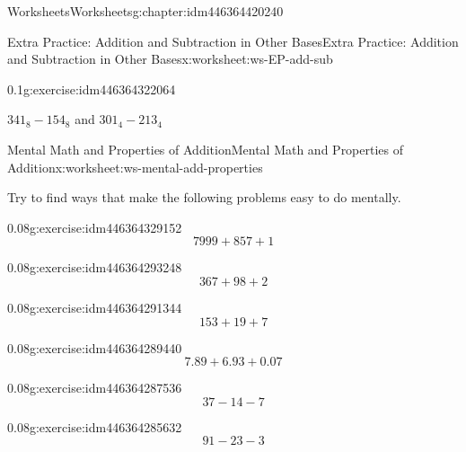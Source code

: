 \documentclass[twoside,11pt,]{book}
\begin{document}
\begin{chapterptx}{Worksheets}{}{Worksheets}{}{}{g:chapter:idm446364420240}
\begin{worksheet-section-numberless}{Extra Practice: Addition and Subtraction in Other Bases}{}{Extra Practice: Addition and Subtraction in Other Bases}{}{}{x:worksheet:ws-EP-add-sub}
\begin{divisionexercise}{2}{}{0.1}{g:exercise:idm446364322064}
\par
\(341_8 - 154_8 \) and \(301_4 -213_4\)%
\end{divisionexercise}%
\end{worksheet-section-numberless}
\restoregeometry
%
%
\typeout{************************************************}
\typeout{************************************************}
%
\begin{worksheet-section-numberless}{Mental Math and Properties of Addition}{}{Mental Math and Properties of Addition}{}{}{x:worksheet:ws-mental-add-properties}
\begin{introduction}{}%
Try to find ways that make the following problems easy to do mentally.%
\end{introduction}%
\begin{divisionexercise}{1}{}{0.08}{g:exercise:idm446364329152}%
%
\begin{equation*}
7999+857+1
\end{equation*}
%
\end{divisionexercise}%
\begin{divisionexercise}{2}{}{0.08}{g:exercise:idm446364293248}%
%
\begin{equation*}
367+98+2
\end{equation*}
%
\end{divisionexercise}%
\begin{divisionexercise}{3}{}{0.08}{g:exercise:idm446364291344}%
%
\begin{equation*}
153+19+7
\end{equation*}
%
\end{divisionexercise}%
\begin{divisionexercise}{4}{}{0.08}{g:exercise:idm446364289440}%
%
\begin{equation*}
7.89+6.93+0.07
\end{equation*}
%
\end{divisionexercise}%
\begin{divisionexercise}{5}{}{0.08}{g:exercise:idm446364287536}%
%
\begin{equation*}
37-14-7
\end{equation*}
%
\end{divisionexercise}%
\begin{divisionexercise}{6}{}{0.08}{g:exercise:idm446364285632}%
%
\begin{equation*}
91-23-3
\end{equation*}

\end{divisionexercise}
\end{worksheet-section-numberless}
\end{chapterptx}
\end{document}
